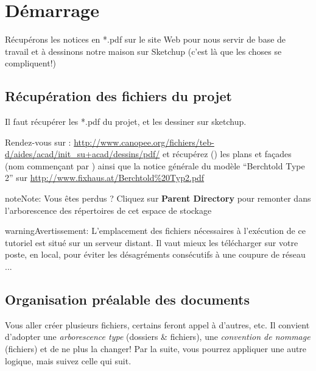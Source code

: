 \documentclass[a4paper,12pt,french]{sphinxmanual}
\begin{document}
\section{Démarrage}
\label{init_su+acad/002_demarrage:demarrage-init-su-acad}\label{init_su+acad/002_demarrage::doc}\label{init_su+acad/002_demarrage:demarrage}
Récupérons les notices en *.pdf sur le site Web pour nous servir de base de travail et à dessinons notre maison sur Sketchup (c'est là que les choses se compliquent!)


\subsection{Récupération des fichiers du projet}
\label{init_su+acad/002_demarrage:recuperation-des-fichiers-du-projet}
Il faut récupérer les *.pdf du projet, et les dessiner sur sketchup.

Rendez-vous sur : \url{http://www.canopee.org/fichiers/teb-d/aides/acad/init\_su+acad/dessins/pdf/} et récupérez () les plans et façades (nom commençant par  ) ainsi que la notice générale du modèle ``Berchtold Type 2'' sur \url{http://www.fixhaus.at/Berchtold\%20Typ2.pdf}

\begin{notice}{note}{Note:}
Vous êtes perdus ? Cliquez sur \textbf{Parent Directory} pour remonter dans l'arborescence des répertoires de cet espace de stockage
\end{notice}

\begin{notice}{warning}{Avertissement:}
L'emplacement des fichiers nécessaires à l'exécution de ce tutoriel est situé sur un serveur distant. Il vaut mieux les télécharger sur votre poste, en local, pour éviter les désagréments consécutifs à une coupure de réseau ...
\end{notice}


\subsection{Organisation préalable des documents}
\label{init_su+acad/002_demarrage:organisation-prealable-des-documents}
Vous aller créer plusieurs fichiers, certains feront appel à d'autres, etc. Il convient d'adopter une \emph{arborescence type} (dossiers \& fichiers), une \emph{convention de nommage} (fichiers) et de ne plus la changer! Par la suite, vous pourrez appliquer une autre logique, mais suivez celle qui suit.
\end{document}
